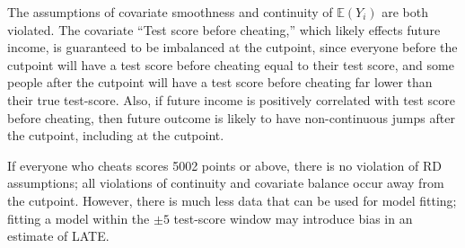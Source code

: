 \documentclass{article}
\def\E{{\mathbb E}}
\begin{document}
\begin{itemize}
\begin{itemize}
       The assumptions of covariate smoothness and continuity of $\E(Y_i)$ are both violated.
       The covariate ``Test score before cheating,'' which likely effects future income, 
       is guaranteed to be imbalanced at the cutpoint, since everyone before the cutpoint will have
       a test score before cheating equal to their test score, and 
       some people after the cutpoint will have a test score before cheating far lower than their true
       test-score.
       Also, if future income is positively correlated with test score before cheating,
       then future outcome is likely to have non-continuous jumps after the cutpoint, 
       including at the cutpoint.
       
       If everyone who cheats scores 5002 points or above, there is no violation of RD assumptions;
       all violations of continuity and covariate balance occur away from the cutpoint. 
       However, there is much less data that can be used for model fitting;
       fitting a model within the $\pm 5$ test-score window may introduce bias in an estimate of LATE.
     \end{itemize}
\end{itemize}     
\end{document}
